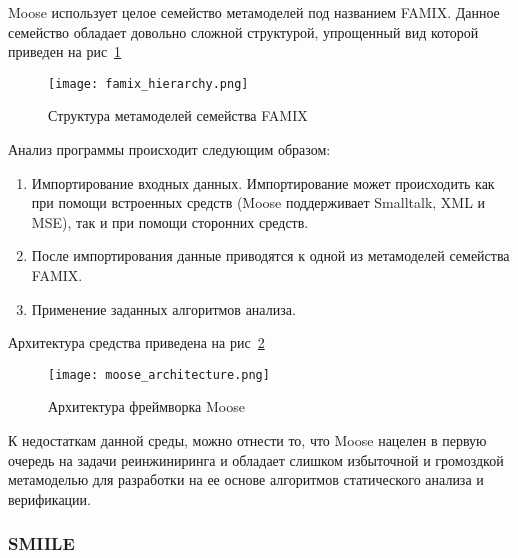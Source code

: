 
Moose использует целое семейство метамоделей под названием FAMIX. Данное
семейство обладает довольно сложной структурой, упрощенный вид которой приведен
на рис~\ref{fig:famix_hierarchy}

\begin{figure}[ht!]
     \begin{center}
         \texttt{[image: famix\_hierarchy.png]}
     \end{center}
     \caption{Структура метамоделей семейства FAMIX}
     \label{fig:famix_hierarchy}
\end{figure}
\newpage

Анализ программы происходит следующим образом:

\begin{enumerate}
    \item Импортирование входных данных. Импортирование может происходить как
    при помощи встроенных средств (Moose поддерживает Smalltalk, XML и MSE),
    так и при помощи сторонних средств.
    \item После импортирования данные приводятся к одной из метамоделей
    семейства FAMIX.
    \item Применение заданных алгоритмов анализа.
\end{enumerate}

Архитектура средства приведена на рис~\ref{fig:moose_architecture}

\begin{figure}[ht!]
    \begin{center}
        \texttt{[image: moose\_architecture.png]}
    \end{center}
    \caption{Архитектура фреймворка Moose}
    \label{fig:moose_architecture}
\end{figure}

К недостаткам данной среды, можно отнести то, что Moose нацелен в первую очередь
на задачи реинжиниринга и обладает слишком избыточной и громоздкой метамоделью
для разработки на ее основе алгоритмов статического анализа и верификации.

\subsubsection{SMIILE}

